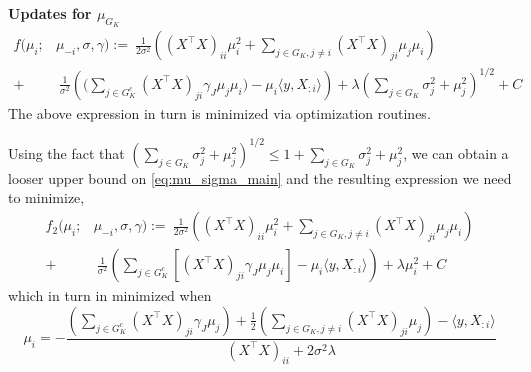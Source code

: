 \documentclass[12pt]{article}
\begin{document}
\textbf{Updates for $\mu_{G_K}$}
\begin{equation} \label{eq:mu_update}
\begin{aligned}
    f(\mu_i; & \mu_{-i}, \sigma, \gamma) :=\
    \frac{1}{2\sigma^2} \left(
	(X^\top X)_{ii} \mu_i^2 + 
	\sum_{j \in G_K, j\neq i} (X^\top X)_{ji} \mu_j \mu_i
    \right) \\
+ &\
    \frac{1}{\sigma^2} \left(
	\bigg( \sum_{j \in G_K^c} (X^\top X)_{ji} \gamma_{J} \mu_j \mu_i \bigg) -
	\mu_i \langle y, X_{:i} \rangle   
    \right)
+
    \lambda \left( \sum_{j \in G_K} 
	\sigma_j^2 + \mu_j^2
    \right)^{1/2} + C
\end{aligned}
\end{equation}
The above expression in turn is minimized via optimization routines.

Using the fact that $ \left( \sum_{j \in G_K} \sigma_j^2 + \mu_j^2 \right)^{1/2} \leq 1 + \sum_{j \in G_K} \sigma_j^2 + \mu_j^2 $, we can obtain a looser upper bound on \eqref{eq:mu_sigma_main} and the resulting expression we need to minimize,
\begin{equation}
\begin{aligned}
    f_2(\mu_i; & \mu_{-i}, \sigma, \gamma) :=\
    \frac{1}{2\sigma^2} \left(
	(X^\top X)_{ii} \mu_i^2 + 
	\sum_{j \in G_K, j\neq i} (X^\top X)_{ji} \mu_j \mu_i
    \right) \\
+ &\
    \frac{1}{\sigma^2} \left(
	\sum_{j \in G_K^c} \left[ (X^\top X)_{ji} \gamma_{J} \mu_j \mu_i \right] -
	\mu_i \langle y, X_{:i} \rangle   
    \right)
+
    \lambda \mu_i^2 + C
\end{aligned}
\end{equation}
which in turn in minimized when
\begin{equation} \label{eq:mu_analytic}
    \mu_i =
    - \frac{
	\left(\sum_{j \in G_K^c} (X^\top X)_{ji} \gamma_{J} \mu_j \right) +
	\frac{1}{2} \left(\sum_{j \in G_K, j\neq i} (X^\top X)_{ji} \mu_j \right)-
	\langle y, X_{:i} \rangle 
    }{
	(X^\top X)_{ii} +
	2 \sigma^2 \lambda 
    }
\end{equation}
\end{document}
